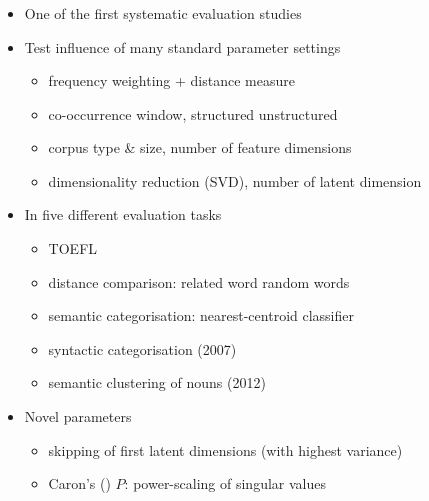 \documentclass[t]{beamer} %
\begin{document}
\begin{frame}
  \frametitle{\citet{Bullinaria:Levy:07,Bullinaria:Levy:12}}
  
  \ungap[1]
  \begin{itemize}
  \item One of the first systematic evaluation studies
  \item Test influence of many standard parameter settings
    \begin{itemize}
    \item frequency weighting + distance measure
    \item co-occurrence window, structured \vs unstructured
    \item corpus type \& size, number of feature dimensions
    \item dimensionality reduction (SVD), number of latent dimension
    \end{itemize}
  \item<2-> In five different evaluation tasks
    \begin{itemize}
    \item TOEFL
    \item distance comparison: related word  random words
    \item semantic categorisation: nearest-centroid classifier
    \item syntactic categorisation (2007)
    \item semantic clustering of nouns (2012)
    \end{itemize}
  \item<3-> Novel parameters
    \begin{itemize}
    \item skipping of first latent dimensions (with highest variance)
    \item Caron's (\citeyear{Caron:01}) $P$: power-scaling of singular values
    \end{itemize}
  \end{itemize}
%
%
%
%
%
\end{frame}
\end{document}

